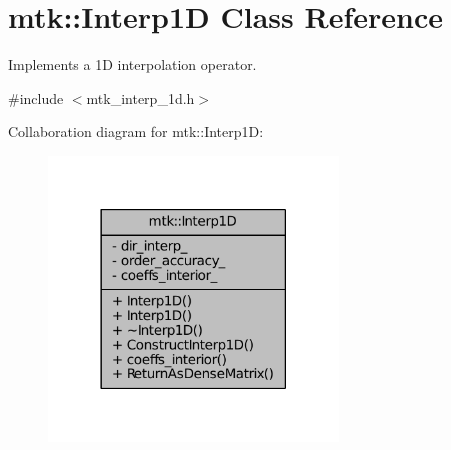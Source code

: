 \hypertarget{classmtk_1_1Interp1D}{\section{mtk\+:\+:Interp1\+D Class Reference}
\label{classmtk_1_1Interp1D}
}


Implements a 1\+D interpolation operator.  




{\ttfamily \#include $<$mtk\+\_\+interp\+\_\+1d.\+h$>$}



Collaboration diagram for mtk\+:\+:Interp1\+D\+:\nopagebreak
\begin{figure}[H]
\begin{center}
\leavevmode
\includegraphics[width=218pt]{classmtk_1_1Interp1D__coll__graph}
\end{center}
\end{figure}
